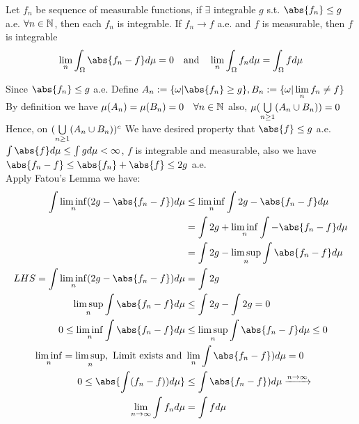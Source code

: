 \newpage
\begin{thm}
\label{DCT}
Let $f_n$ be sequence of measurable functions, if $\exists$ integrable $g$ s.t. $\abs{f_n} \leq g$ a.e. $\forall n \in \mathbb{N}$, then each $f_n$ is integrable. If $f_n \rightarrow f$ a.e. and $f$ is measurable, then $f$ is integrable
\begin{equation*}
    \biglim{n} \into \abs{f_n - f} d\mu = 0 \quad \text{and} \quad \biglim{n}\into f_n d\mu = \into f d\mu 
\end{equation*}
\end{thm}
\vspace{2cm}
\pf Since $\abs{f_n}\leq g$ a.e. Define $A_n := \{\omega| \abs{f_n}\geq g\}, B_n := \{\omega| \biglim{n}f_n \neq f\}$ \\
By definition we have $\mu(A_n)=\mu(B_n)=0\quad \forall n\in \mathbb{N}$ also,  $\mu(\bigcup\limits_{n\geq1}(A_n\cup B_n)) = 0$ \\
Hence, on $(\bigcup\limits_{n\geq1}(A_n\cup B_n))^c$ We have desired property that $\abs{f}\leq g$ a.e. \\
$\int \abs{f} d\mu \leq \int g d\mu < \infty$, $f$ is integrable and measurable, also we have $\abs{f_n - f} \leq \abs{f_n} +\abs{f} \leq 2g$ a.e. \\
Apply Fatou's Lemma we have:
\begin{align*}
    \int \linf{n}(2g - \abs{f_n-f}) d\mu &\leq \linf{n}\int 2g - \abs{f_n - f}d\mu \\
    &= \int 2g + \linf{n}\int -\abs{f_n-f} d\mu \\
    &= \int 2g - \lsup{n} \int \abs{f_n-f} d\mu \\
    LHS = \int \linf{n}(2g - \abs{f_n-f}) d\mu &= \int 2g \\
    \lsup{n} \int \abs{f_n-f} d\mu &\leq \int 2g - \int 2g = 0 \\
    0 \leq \linf{n}\int \abs{f_n-f} d\mu &\leq \lsup{n}\int \abs{f_n-f} d\mu \leq 0 \\
    \linf{n} = \lsup{n}, \text{ Limit exists and } &\biglim{n}\int \abs{f_n-f}) d\mu = 0 \\
    0 \leq \abs{\int (f_n-f)) d\mu} &\leq \int \abs{f_n-f}) d\mu \xrightarrow{n \rightarrow \infty} \\
    \biglim{n \rightarrow \infty} \int f_n d\mu &= \int f d\mu
\end{align*}
\newpage
